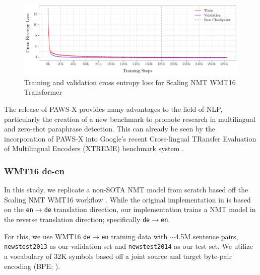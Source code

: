 \documentclass[11pt,a4paper]{article}
\begin{document}
\begin{figure}
  \centering 
  \includegraphics[trim={0cm 0cm 0cm 0cm},clip,width=\textwidth]{transformer_nmt_evolution.pdf}
  \caption{Training and validation cross entropy loss for Scaling NMT WMT16 Transformer}
  \label{transformer_nmt_evolution}
\end{figure}

The release of PAWS-X provides many advantages to the field of NLP, particularly the creation of a new benchmark to promote research in multilingual and zero-shot paraphrase detection. This can already be seen by the incorporation of PAWS-X into Google's recent Cross-lingual TRansfer Evaluation of Multilingual Encoders (XTREME) benchmark system \cite{hu2020xtreme}.

\subsubsection{WMT16 de-en}

In this study, we replicate a non-SOTA NMT model from scratch based off the Scaling NMT WMT16 workflow \cite{ott2018scaling}. While the original implementation in \citet{ott2018scaling} is based on the \texttt{en$\rightarrow$de} translation direction, our implementation trains a NMT model in the reverse translation direction; specifically \texttt{de$\rightarrow$en}.

For this, we use WMT16 \texttt{de$\rightarrow$en} training data with $\sim$4.5M sentence pairs, \texttt{newstest2013} as our validation set and \texttt{newstest2014} as our test set. We utilize a vocabulary of 32K symbols based off a joint source and target byte-pair encoding (BPE; \citealt{sennrich2015neural}).   

\end{document}
